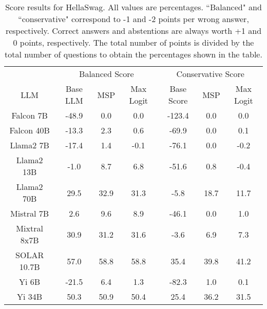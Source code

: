\renewcommand\arraystretch{1.2}
\begin{table*}
\centering
\begin{tabular}{c|c|c|c|c|c|c}
& \multicolumn{3}{c|}{Balanced Score} & \multicolumn{3}{c}{Conservative Score} \\ 
LLM & Base LLM & MSP & Max Logit & Base Score & MSP & Max Logit\\ \hline
Falcon 7B & -48.9 & 0.0 & 0.0 & -123.4 & 0.0 & 0.0\\
Falcon 40B & -13.3 & 2.3 & 0.6 & -69.9 & 0.0 & 0.1\\
Llama2 7B & -17.4 & 1.4 & -0.1 & -76.1 & 0.0 & -0.2\\
Llama2 13B & -1.0 & 8.7 & 6.8 & -51.6 & 0.8 & -0.4\\
Llama2 70B & 29.5 & 32.9 & 31.3 & -5.8 & 18.7 & 11.7\\
Mistral 7B & 2.6 & 9.6 & 8.9 & -46.1 & 0.0 & 1.0\\
Mixtral 8x7B & 30.9 & 31.2 & 31.6 & -3.6 & 6.9 & 7.3\\
SOLAR 10.7B & 57.0 & 58.8 & 58.8 & 35.4 & 39.8 & 41.2\\
Yi 6B & -21.5 & 6.4 & 1.3 & -82.3 & 1.0 & 0.1\\
Yi 34B & 50.3 & 50.9 & 50.4 & 25.4 & 36.2 & 31.5\\
\hline
\end{tabular}
\caption{Score results for HellaSwag. All values are percentages. ``Balanced" and ``conservative" correspond to -1 and -2 points per wrong answer, respectively. Correct answers and abstentions are always worth +1 and 0 points, respectively. The total number of points is divided by the total number of questions to obtain the percentages shown in the table.}
\label{tab:hellaswag_score}
\end{table*}

